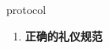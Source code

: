 
\begin{frame}
{\huge protocol}
\begin{center}
\begin{enumerate}\Large
  \item \textbf{正确的礼仪规范}
\end{enumerate}
\end{center}
\end{frame}
